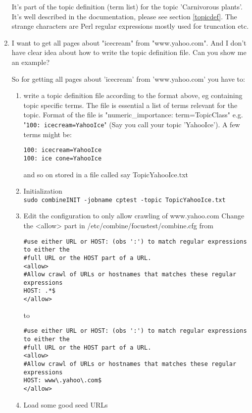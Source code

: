 \begin{enumerate}
It's part of the topic definition (term list) for the topic 'Carnivorous plants'.
It's well described in the documentation, please see
section \ref{topicdef}.
The strange characters are Perl regular expressions mostly used for truncation etc.

\item
I want to get all pages about "icecream" from "www.yahoo.com". And I don't have clear idea about how to write the topic
definition file. Can you show me an example?

So for getting all pages about 'icecream' from 'www.yahoo.com' you have to:
\begin{enumerate}
\item write a topic definition file according to the format above, eg containing topic specific
   terms. The file is essential a list of terms relevant for the topic. Format of the file is
   "numeric\_importance: term=TopicClass" e.g. "{\tt 100: icecream=YahooIce}"
   (Say you call your topic 'YahooIce'). A few terms might be:\\
\begin{verbatim}
100: icecream=YahooIce
100: ice cone=YahooIce
\end{verbatim}
  and so on stored in a file called say TopicYahooIce.txt

\item Initialization\\
{\tt sudo combineINIT -jobname cptest -topic TopicYahooIce.txt}

\item Edit the configuration to only allow crawling of www.yahoo.com
Change the <allow> part in /etc/combine/focustest/combine.cfg from

\begin{verbatim}
#use either URL or HOST: (obs ':') to match regular expressions to either the
#full URL or the HOST part of a URL.
<allow>
#Allow crawl of URLs or hostnames that matches these regular expressions
HOST: .*$
</allow>
\end{verbatim}

to

\begin{verbatim}
#use either URL or HOST: (obs ':') to match regular expressions to either the
#full URL or the HOST part of a URL.
<allow>
#Allow crawl of URLs or hostnames that matches these regular expressions
HOST: www\.yahoo\.com$
</allow>
\end{verbatim}

\item Load some good seed URLs


\end{enumerate}
\end{enumerate}
